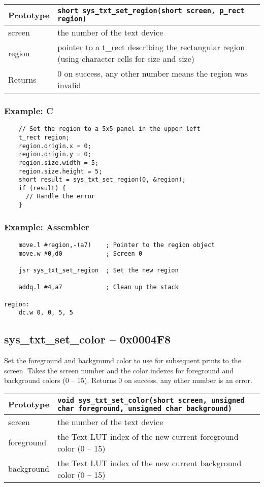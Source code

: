 \bigskip

\begin{tabular}{|l||l|} \hline
Prototype & \lstinline!short sys_txt_set_region(short screen, p_rect region)! \\ \hline
screen & the number of the text device \\ \hline
region & pointer to a t\_rect describing the rectangular region (using character cells for size and size) \\ \hline
Returns & 0 on success, any other number means the region was invalid \\ \hline
\end{tabular}

\subsubsection*{Example: C}
\begin{lstlisting}
    // Set the region to a 5x5 panel in the upper left
    t_rect region;
    region.origin.x = 0;
    region.origin.y = 0;
    region.size.width = 5;
    region.size.height = 5;
    short result = sys_txt_set_region(0, &region);
    if (result) {
      // Handle the error
    }
\end{lstlisting}

\subsubsection*{Example: Assembler}
\begin{verbatim}
    move.l #region,-(a7)    ; Pointer to the region object
    move.w #0,d0            ; Screen 0

    jsr sys_txt_set_region  ; Set the new region

    addq.l #4,a7            ; Clean up the stack

region:
    dc.w 0, 0, 5, 5
\end{verbatim}

\subsection*{sys\_txt\_set\_color -- 0x0004F8}
Set the foreground and background color to use for subsequent prints to the screen.
Takes the screen number and the color indexes for foreground and background colors (0 -- 15).
Returns 0 on success, any other number is an error.

\bigskip

\begin{tabular}{|l||l|} \hline
Prototype & \lstinline!void sys_txt_set_color(short screen, unsigned char foreground, unsigned char background)! \\ \hline
screen & the number of the text device \\ \hline
foreground & the Text LUT index of the new current foreground color (0 -- 15) \\ \hline
background & the Text LUT index of the new current background color (0 -- 15) \\ \hline
\end{tabular}

